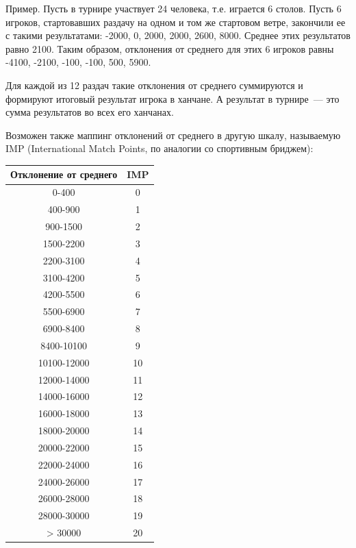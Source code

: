 \begin{additional}
\vspace{0.3cm}

Пример. Пусть в турнире участвует 24 человека, т.е. играется 6 столов. Пусть 6 игроков, стартовавших раздачу на одном и том же стартовом ветре, закончили ее с такими результатами: -2000, 0, 2000, 2000, 2600, 8000. Среднее этих результатов равно 2100. Таким образом, отклонения от среднего для этих 6 игроков равны -4100, -2100, -100, -100, 500, 5900.

\vspace{0.3cm}

Для каждой из 12 раздач такие отклонения от среднего суммируются и формируют итоговый результат игрока в ханчане. А результат в турнире~--- это сумма результатов во всех его ханчанах.

\vspace{0.3cm}

Возможен также маппинг отклонений от среднего в другую шкалу, называемую IMP (International Match Points, по аналогии со спортивным бриджем):

\begin{tabular}{|c|c|}
	\hline
	Отклонение от среднего & IMP \\
	\hline
	0-400 & 0 \\
	\hline
	400-900 & 1 \\
	\hline
	900-1500 & 2 \\
	\hline
	1500-2200 & 3 \\
	\hline
	2200-3100 & 4 \\
	\hline
	3100-4200 & 5 \\
	\hline
	4200-5500 & 6 \\
	\hline
	5500-6900 & 7 \\
	\hline
	6900-8400 & 8 \\
	\hline
	8400-10100 & 9 \\
	\hline
	10100-12000 & 10 \\
	\hline
	12000-14000 & 11 \\
	\hline
	14000-16000 & 12 \\
	\hline
	16000-18000 & 13 \\
	\hline
	18000-20000 & 14 \\
	\hline
	20000-22000 & 15 \\
	\hline
	22000-24000 & 16 \\
	\hline
	24000-26000 & 17 \\
	\hline
	26000-28000 & 18 \\
	\hline
	28000-30000 & 19 \\
	\hline
	> 30000 & 20 \\
	\hline
\end{tabular}


\end{additional}
